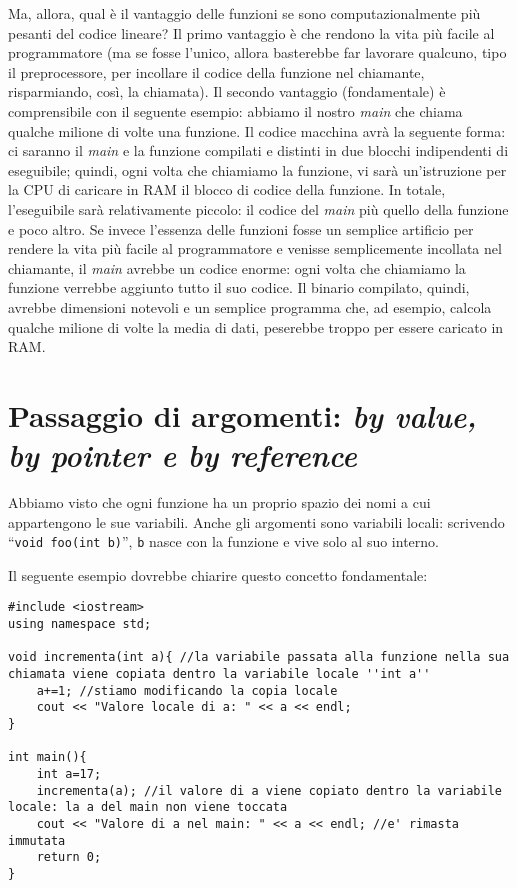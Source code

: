 \begin{small}
Ma, allora, qual è il vantaggio delle funzioni se sono computazionalmente più pesanti del codice lineare? Il primo vantaggio è che rendono la vita più facile al programmatore (ma se fosse l'unico, allora basterebbe far lavorare qualcuno, tipo il preprocessore, per incollare il codice della funzione nel chiamante, risparmiando, così, la chiamata). Il secondo vantaggio (fondamentale) è comprensibile con il seguente esempio: abbiamo il nostro \emph{main} che chiama qualche milione di volte una funzione. Il codice macchina avrà la seguente forma: ci saranno il \emph{main} e la funzione compilati e distinti in due blocchi indipendenti di eseguibile; quindi, ogni volta che chiamiamo la funzione, vi sarà un'istruzione per la CPU di caricare in RAM il blocco di codice della funzione. In totale, l'eseguibile sarà relativamente piccolo: il codice del \emph{main} più quello della funzione e  poco altro. Se invece l'essenza delle funzioni fosse un semplice artificio per rendere la vita più facile al programmatore e venisse semplicemente incollata nel chiamante, il \emph{main} avrebbe un codice enorme: ogni volta che chiamiamo la funzione verrebbe aggiunto tutto il suo codice. Il binario compilato, quindi, avrebbe dimensioni notevoli e un semplice programma che, ad esempio, calcola qualche milione di volte la media di dati, peserebbe troppo per essere caricato in RAM.  
\end{small}


\section{Passaggio di argomenti: \emph{by value, by pointer e by reference}}\label{by}
Abbiamo visto che ogni funzione ha un proprio spazio dei nomi a cui appartengono le sue variabili. Anche gli argomenti sono variabili locali: scrivendo ``\lstinline|void foo(int b)|'', \verb|b| nasce con la funzione e vive solo al suo interno. 

Il seguente esempio dovrebbe chiarire questo  concetto fondamentale:
\begin{lstlisting}
#include <iostream>
using namespace std;

void incrementa(int a){ //la variabile passata alla funzione nella sua chiamata viene copiata dentro la variabile locale ''int a''
	a+=1; //stiamo modificando la copia locale
	cout << "Valore locale di a: " << a << endl;	
}

int main(){
	int a=17;
	incrementa(a); //il valore di a viene copiato dentro la variabile locale: la a del main non viene toccata
	cout << "Valore di a nel main: " << a << endl; //e' rimasta immutata
	return 0;
}
\end{lstlisting}



